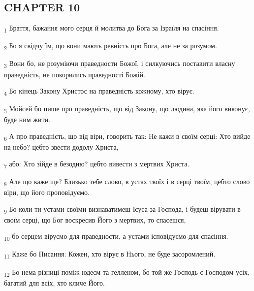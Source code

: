 \subsection{CHAPTER 10}
\begin{tcolorbox}
\textsubscript{1} Браття, бажання мого серця й молитва до Бога за Ізраїля на спасіння.
\end{tcolorbox}
\begin{tcolorbox}
\textsubscript{2} Бо я свідчу їм, що вони мають ревність про Бога, але не за розумом.
\end{tcolorbox}
\begin{tcolorbox}
\textsubscript{3} Вони бо, не розуміючи праведности Божої, і силкуючись поставити власну праведність, не покорились праведності Божій.
\end{tcolorbox}
\begin{tcolorbox}
\textsubscript{4} Бо кінець Закону Христос на праведність кожному, хто вірує.
\end{tcolorbox}
\begin{tcolorbox}
\textsubscript{5} Мойсей бо пише про праведність, що від Закону, що людина, яка його виконує, буде ним жити.
\end{tcolorbox}
\begin{tcolorbox}
\textsubscript{6} А про праведність, що від віри, говорить так: Не кажи в своїм серці: Хто вийде на небо? цебто звести додолу Христа,
\end{tcolorbox}
\begin{tcolorbox}
\textsubscript{7} або: Хто зійде в безодню? цебто вивести з мертвих Христа.
\end{tcolorbox}
\begin{tcolorbox}
\textsubscript{8} Але що каже ще? Близько тебе слово, в устах твоїх і в серці твоїм, цебто слово віри, що його проповідуємо.
\end{tcolorbox}
\begin{tcolorbox}
\textsubscript{9} Бо коли ти устами своїми визнаватимеш Ісуса за Господа, і будеш вірувати в своїм серці, що Бог воскресив Його з мертвих, то спасешся,
\end{tcolorbox}
\begin{tcolorbox}
\textsubscript{10} бо серцем віруємо для праведности, а устами ісповідуємо для спасіння.
\end{tcolorbox}
\begin{tcolorbox}
\textsubscript{11} Каже бо Писання: Кожен, хто вірує в Нього, не буде засоромлений.
\end{tcolorbox}
\begin{tcolorbox}
\textsubscript{12} Бо нема різниці поміж юдеєм та гелленом, бо той же Господь є Господом усіх, багатий для всіх, хто кличе Його.
\end{tcolorbox}
